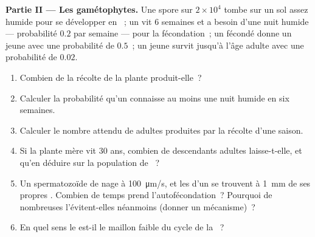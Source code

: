 \begin{problem}
\medskip
\noindent\textbf{Partie II --- Les gamétophytes.}
Une spore sur $2\times 10^{4}$ tombe sur un sol assez humide pour se
développer en ~; un  vit \num{6} semaines et a besoin
d'une nuit humide --- probabilité $0.2$ par semaine --- pour la
fécondation~; un  fécondé donne un jeune  avec une
probabilité de
$0.5$~; un jeune  survit jusqu'à l'âge adulte avec une
probabilité de
$0.02$.
\begin{enumerate}[resume]
  \item Combien de  la récolte de la plante produit-elle~?
  \item Calculer la probabilité qu'un  connaisse au moins une
        nuit humide en six semaines.
  \item Calculer le nombre attendu de  adultes produites par la
        récolte d'une saison.
  \item Si la plante mère vit \num{30} ans, combien de descendants
        adultes laisse-t-elle, et qu'en déduire sur la population de
        ~?
  \item Un spermatozoïde de  nage à \qty{100}{\micro m/s}, et les
         d'un  se trouvent à \qty{1}{mm} de ses
        propres . Combien de temps prend l'autofécondation~?
        Pourquoi de nombreuses  l'évitent-elles néanmoins
        (donner un mécanisme)~?
  \item En quel sens le  est-il le maillon faible du cycle de
        la ~?
\end{enumerate}


\end{problem}
